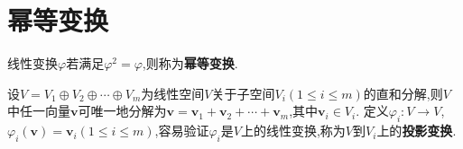 \documentclass[../../main.tex]{subfiles}%
\begin{document}
\section{幂等变换}

\begin{definition}[幂等变换]\label{definition:幂等变换}
线性变换\(\varphi\)若满足\(\varphi^2 = \varphi\),则称为\textbf{幂等变换}. 
\end{definition}

\begin{definition}[投影变换]\label{definition:投影变换}
设\(V = V_1\oplus V_2\oplus\cdots\oplus V_m\)为线性空间\(V\)关于子空间\(V_i(1\leqslant  i\leqslant  m)\)的直和分解,则\(V\)中任一向量\(\boldsymbol{v}\)可唯一地分解为\(\boldsymbol{v}=\boldsymbol{v}_1+\boldsymbol{v}_2+\cdots+\boldsymbol{v}_m\),其中\(\boldsymbol{v}_i\in V_i\). 定义\(\varphi_i:V\to V\),\(\varphi_i(\boldsymbol{v})=\boldsymbol{v}_i(1\leqslant  i\leqslant  m)\),容易验证\(\varphi_i\)是\(V\)上的线性变换,称为\(V\)到\(V_i\)上的\textbf{投影变换}. 
\end{definition}
\end{document}
